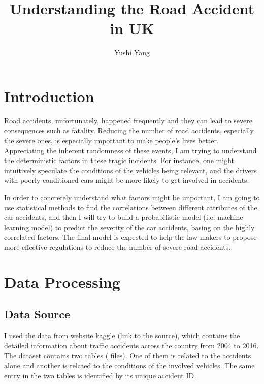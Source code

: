 \documentclass[12pt,a4paper]{article}
\begin{document}
\title{
Understanding the Road Accident in UK
}
\author{Yushi Yang}
\maketitle

\section{Introduction}

Road accidents, unfortunately, happened frequently and they can lead to severe consequences such as fatality. Reducing the number of road accidents, especially the severe ones, is especially important to make people's lives better. Appreciating the inherent randomness of these events, I am trying to understand the deterministic factors in these tragic incidents. For instance, one might intuitively speculate the conditions of the vehicles being relevant, and the drivers with poorly conditioned cars might be more likely to get involved in accidents.

In order to concretely understand what factors might be important, I am going to use statistical methods to find the correlations between different attributes of the car accidents, and then I will try to build a probabilistic model (i.e. machine learning model) to predict the severity of the car accidents, basing on the highly correlated factors. The final model is expected to help the law makers to propose more effective regulations to reduce the number of severe road accidents.

\section{Data Processing}

\subsection{Data Source}

I used the data from website kaggle (\href{https://www.kaggle.com/tsiaras/uk-road-safety-accidents-and-vehicles?select=Accident_Information.csv}{link to the source}), which contains the detailed information about traffic accidents across the country from 2004 to 2016. 
The dataset contains two tables ( files). One of them is related to the accidents alone and another is related to the conditions of the involved vehicles. The same entry in the two tables is identified by its unique accident ID.
\end{document}

